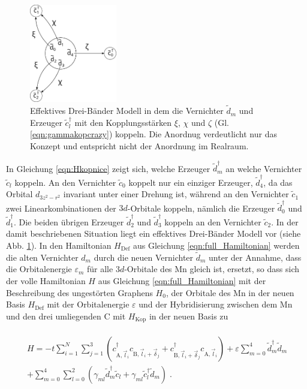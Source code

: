 \begin{figure}
    \centering
    \includegraphics[width = 0.34\textwidth]{Plots/3band.pdf}
    \caption{Effektives Drei-Bänder Modell in dem die
    Vernichter $\tilde{d}_m$ und Erzeuger $\tilde{c}_l^{\dagger}$ mit den Kopplungsstärken
    $\xi$, $\chi$ und $\zeta$ (Gl. \eqref{eqn:gammakopcrazy}) koppeln.
    Die Anordnug verdeutlicht nur das Konzept und entspricht nicht der 
    Anordnung im Realraum.}
    \label{fig:3band}
\end{figure}
In Gleichung \eqref{eqn:Hkopnice} zeigt sich, welche Erzeuger $\tilde{d}_m^{\dagger}$ an welche Vernichter $\tilde{c}_l$ koppeln.
An den Vernichter $\tilde{c}_{0}$ koppelt nur ein einziger Erzeuger, $\tilde{d}_{4}^{\dagger}$, da das Orbital $d_{3z^2-r^2}$ invariant unter einer Drehung ist,
während an den Vernichter $\tilde{c}_{1}$ zwei Linearkombinationen der $3d$-Orbitale koppeln, nämlich 
die Erzeuger $\tilde{d}_{0}^{\dagger}$ und $\tilde{d}_{1}^{\dagger}$. 
Die beiden übrigen Erzeuger $\tilde{d}_{2}^{\dagger}$ und $\tilde{d}_{3}^{\dagger}$ koppeln an den Vernichter  $\tilde{c}_{2}$.
In der damit beschriebenen Situation liegt ein effektives Drei-Bänder Modell vor (siehe Abb. \ref{fig:3band}).
In den Hamiltonian $H_\text{Def}$ aus Gleichung \eqref{eqn:full_Hamiltonian} werden die alten Vernichter $d_m$ durch die neuen Vernichter $\tilde{d}_m$ unter 
der Annahme, dass die Orbitalenergie $\varepsilon_m$ für alle $3d$-Orbitale des Mn gleich ist, ersetzt, so dass sich der volle Hamiltonian $H$
aus Gleichung \eqref{eqn:full_Hamiltonian} mit der Beschreibung des ungestörten Graphens $H_0$, 
der Orbitale des Mn in der neuen Basis $H_{\text{Def}}$ mit der Orbitalenergie $\varepsilon$ und
der Hybridisierung zwischen dem Mn und den drei umliegenden C mit $H_\text{Kop}$ in der neuen Basis zu\\
\\
\begin{multline}
    H = -t\sum_{i=1}^N \sum_{j=1}^3 \left ( c_{\text{A},\vec{l}_i}^\dagger c_{\text{B},\vec{l}_i+\vec{\delta}_j} + 
    c_{\text{B},\vec{l}_i+\vec{\delta}_j}^\dagger c_{\text{A},\vec{l}_i} \right ) + \varepsilon \sum_{m=0}^4 \tilde{d}^\dagger_m \tilde{d}_m \\
    +\sum_{m=0}^4\sum_{l=0}^2(\gamma_{ml} \tilde{d}^\dagger_m \tilde{c}_l + \gamma_{ml} \tilde{c}^\dagger_l \tilde{d}_m) \; .
\end{multline}
